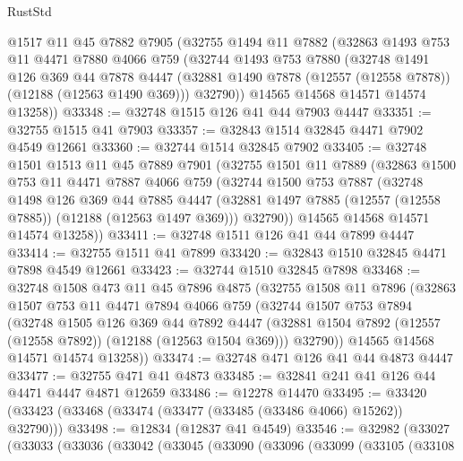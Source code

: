 \begin{lexlean}{RustStd}
\begin{coremodule}
    @1517
    @11
    @45
    @7882
    @7905
    (@32755
      @1494
      @11
      @7882
      (@32863
        @1493
        @753
        @11
        @4471
        @7880
        @4066
        @759
        (@32744
          @1493
          @753
          @7880
          (@32748
            @1491
            @126
            @369
            @44
            @7878
            @4447
            (@32881 @1490 @7878 (@12557 (@12558 @7878)) (@12188 (@12563 @1490 @369)))
            @32790))
        @14565
        @14568
        @14571
        @14574
        @13258))
@33348 := @32748 @1515 @126 @41 @44 @7903 @4447
@33351 := @32755 @1515 @41 @7903
@33357 := @32843 @1514 @32845 @4471 @7902 @4549 @12661
@33360 := @32744 @1514 @32845 @7902
@33405 := @32748
    @1501
    @1513
    @11
    @45
    @7889
    @7901
    (@32755
      @1501
      @11
      @7889
      (@32863
        @1500
        @753
        @11
        @4471
        @7887
        @4066
        @759
        (@32744
          @1500
          @753
          @7887
          (@32748
            @1498
            @126
            @369
            @44
            @7885
            @4447
            (@32881 @1497 @7885 (@12557 (@12558 @7885)) (@12188 (@12563 @1497 @369)))
            @32790))
        @14565
        @14568
        @14571
        @14574
        @13258))
@33411 := @32748 @1511 @126 @41 @44 @7899 @4447
@33414 := @32755 @1511 @41 @7899
@33420 := @32843 @1510 @32845 @4471 @7898 @4549 @12661
@33423 := @32744 @1510 @32845 @7898
@33468 := @32748
    @1508
    @473
    @11
    @45
    @7896
    @4875
    (@32755
      @1508
      @11
      @7896
      (@32863
        @1507
        @753
        @11
        @4471
        @7894
        @4066
        @759
        (@32744
          @1507
          @753
          @7894
          (@32748
            @1505
            @126
            @369
            @44
            @7892
            @4447
            (@32881 @1504 @7892 (@12557 (@12558 @7892)) (@12188 (@12563 @1504 @369)))
            @32790))
        @14565
        @14568
        @14571
        @14574
        @13258))
@33474 := @32748 @471 @126 @41 @44 @4873 @4447
@33477 := @32755 @471 @41 @4873
@33485 := @32841 @241 @41 @126 @44 @4471 @4447 @4871 @12659
@33486 := @12278 @14470
@33495 := @33420 (@33423 (@33468 (@33474 (@33477 (@33485 (@33486 @4066) @15262)) @32790)))
@33498 := @12834 (@12837 @41 @4549)
@33546 := @32982
    (@33027
      (@33033
        (@33036
          (@33042
            (@33045
              (@33090
                (@33096
                  (@33099
                    (@33105
                      (@33108

\end{coremodule}
\end{lexlean}
